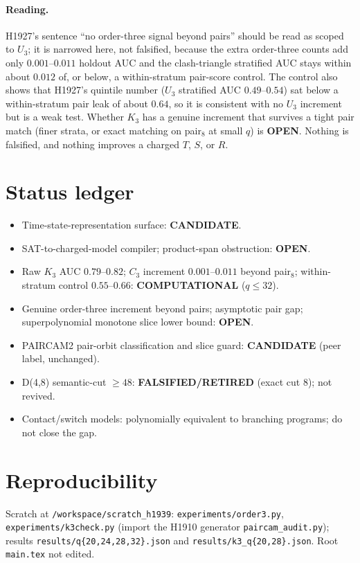 \documentclass[11pt]{article}
\begin{document}
\paragraph{Reading.} H1927's sentence ``no order-three signal beyond pairs'' should be read as scoped to $U_3$; it is narrowed here, not falsified, because the extra order-three counts add only $0.001$--$0.011$ holdout AUC and the clash-triangle stratified AUC stays within about $0.012$ of, or below, a within-stratum pair-score control. The control also shows that H1927's quintile number ($U_3$ stratified AUC $0.49$--$0.54$) sat below a within-stratum pair leak of about $0.64$, so it is consistent with no $U_3$ increment but is a weak test. Whether $K_3$ has a genuine increment that survives a tight pair match (finer strata, or exact matching on pair$_8$ at small $q$) is \textbf{OPEN}. Nothing is falsified, and nothing improves a charged $T$, $S$, or $R$.

\section*{Status ledger}
\begin{itemize}
\item Time-state-representation surface: \textbf{CANDIDATE}.
\item SAT-to-charged-model compiler; product-span obstruction: \textbf{OPEN}.
\item Raw $K_3$ AUC $0.79$--$0.82$; $C_3$ increment $0.001$--$0.011$ beyond pair$_8$; within-stratum control $0.55$--$0.66$: \textbf{COMPUTATIONAL} ($q\le32$).
\item Genuine order-three increment beyond pairs; asymptotic pair gap; superpolynomial monotone slice lower bound: \textbf{OPEN}.
\item PAIRCAM2 pair-orbit classification and slice guard: \textbf{CANDIDATE} (peer label, unchanged).
\item D(4,8) semantic-cut $\ge48$: \textbf{FALSIFIED/RETIRED} (exact cut 8); not revived.
\item Contact/switch models: polynomially equivalent to branching programs; do not close the gap.
\end{itemize}

\section*{Reproducibility}
Scratch at \texttt{/workspace/scratch\_h1939}: \texttt{experiments/order3.py}, \texttt{experiments/k3check.py} (import the H1910 generator \texttt{paircam\_audit.py}); results \texttt{results/q\{20,24,28,32\}.json} and \texttt{results/k3\_q\{20,28\}.json}. Root \texttt{main.tex} not edited.
\end{document}
